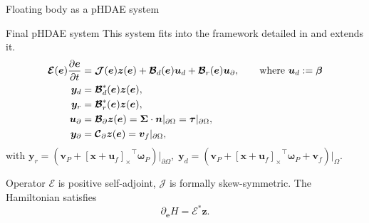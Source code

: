 \documentclass[aspectratio=169]{ISAE-Beamer}
\newcommand{\crmat}[1]{\ensuremath{[#1]_{\times}}}
\begin{document}
\begin{frame}{Floating body as a pHDAE system}
\begin{exampleblock}{Final pHDAE system}
	\setlength{\abovedisplayskip}{1pt}
	\setlength{\belowdisplayskip}{1pt}
This system fits into the framework detailed in  and extends it.
\begin{equation*}
\begin{aligned}
\bm{\mathcal{E}}(\bm{e}) \diffp{\bm{e}}{t} &= \bm{\mathcal{J}}(\bm{e}) \bm{z}(\bm{e}) + \bm{\mathcal{B}}_d(\bm{e}) \bm{u}_d + \bm{\mathcal{B}}_r(\bm{e}) \bm{u}_\partial, \qquad \text{where } \bm{u}_d:=\bm\beta \\
\bm{y}_d &= \bm{\mathcal{B}}_d^*(\bm{e}) \bm{z}(\bm{e}), \\
\bm{y}_r &= \bm{\mathcal{B}}_r^*(\bm{e}) \bm{z}(\bm{e}), \\
\bm{u}_\partial &= \bm{\mathcal{B}}_{\partial} \bm{z}(\bm{e}) =  \bm\Sigma \cdot \bm{n}|_{\partial \Omega} = \bm\tau|_{\partial \Omega}, \\
\bm{y}_\partial &= \bm{\mathcal{C}}_{\partial} \bm{z}(\bm{e}) = \bm{v}_f|_{\partial \Omega},
\end{aligned}
\end{equation*}
with $\bm{y}_r = (\bm{v}_P + \crmat{\bm{x}+\bm{u}_f}^\top \bm{\omega}_P)\vert_{\partial\Omega}, \; \bm{y}_d = (\bm{v}_P + \crmat{\bm{x}+\bm{u}_f}^\top \bm{\omega}_P + \bm{v}_f)\vert_{\Omega}$.
\end{exampleblock}
Operator $\bm{\mathcal{E}}$ is positive self-adjoint, $\bm{\mathcal{J}}$ is formally skew-symmetric.
The Hamiltonian  satisfies 
\begin{equation*}
\partial_{\bm{e}} H = \bm{\mathcal{E}}^* \bm{z}.
\end{equation*}
\end{frame}
\end{document}

